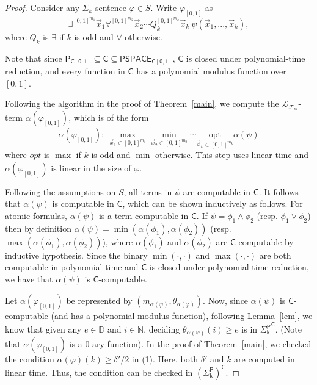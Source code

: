 \documentclass[prodmode]{acmsmall} %
\begin{document}
\begin{proof} Consider any $\Sigma_k$-sentence $\varphi\in S$. Write $\varphi_{[0,1]}$ as
$$\exists^{[0,1]^{m_1}} \vec x_1\forall^{[0,1]^{m_2}}\vec x_2\cdots Q_k^{[0,1]^{m_k}}\vec x_k\ \psi(\vec x_1,...,\vec x_k),$$
where $Q_k$ is $\exists$ if $k$ is odd and $\forall$ otherwise. 

Note that since $\mathsf{P_{C[0,1]}}\subseteq \mathsf{C}\subseteq \mathsf{PSPACE_{C[0,1]}}$, $\mathsf{C}$ is closed under polynomial-time reduction, and every function in $\mathsf{C}$ has a polynomial modulus function over $[0,1]$. 

Following the algorithm in the proof of Theorem~\ref{main}, we compute the $\mathcal{L}_{\mathcal{F}_m}$-term $\alpha(\varphi_{[0,1]})$, which is of the form
$$\alpha(\varphi_{[0,1]}):\ \max_{\vec x_1\in [0,1]^{m_1}}\min_{\vec x_2\in [0,1]^{m_2}}\cdots\underset{\vec x_k\in [0,1]^{m_k}}{\mbox{opt}}\alpha(\psi)$$
where $\mathit{opt}$ is $\max$ if $k$ is odd and $\min$ otherwise. This step uses linear time and $\alpha(\varphi_{[0,1]})$ is linear in the size of $\varphi$.

Following the assumptions on $S$, all terms in $\psi$ are computable in $\mathsf{C}$. It follows that $\alpha(\psi)$ is computable in $\mathsf{C}$, which can be shown inductively as follows. For atomic formulas, $\alpha(\psi)$ is a term computable in $\mathsf{C}$. If $\psi = \phi_1\wedge \phi_2$ (resp. $\phi_1\vee \phi_2$) then by definition $\alpha(\psi) = \min(\alpha(\phi_1), \alpha(\phi_2))$ (resp. $\max(\alpha(\phi_1), \alpha(\phi_2))$), where $\alpha(\phi_1)$ and $\alpha(\phi_2)$ are $\mathsf{C}$-computable by inductive hypothesis. Since the binary $\min(\cdot,\cdot)$ and $\max(\cdot, \cdot)$ are both computable in polynomial-time and $\mathsf{C}$ is closed under polynomial-time reduction, we have that $\alpha(\psi)$ is $\mathsf{C}$-computable. 

Let $\alpha(\varphi_{[0,1]})$ be represented by $(m_{\alpha(\varphi)},\theta_{\alpha(\varphi)})$. Now, since $\alpha(\psi)$ is $\mathsf{C}$-computable (and has a polynomial modulus function), following Lemma~\ref{lem}, we know that given any $e\in \mathbb{D}$ and $i\in \mathbb{N}$, deciding $\theta_{\alpha(\varphi)}(i)\geq e$ is in $\mathsf{{\Sigma_k^P}^C}$. (Note that $\alpha(\varphi_{[0,1]})$ is a 0-ary function). In the proof of Theorem~\ref{main}, we checked the condition $\alpha(\varphi)(k)\geq \delta'/2$ in (1). Here, both $\delta'$ and $k$ are computed in linear time. Thus, the condition can be checked in $\mathsf{(\Sigma_k^P)^C}$. 


\end{proof}
\end{document}
